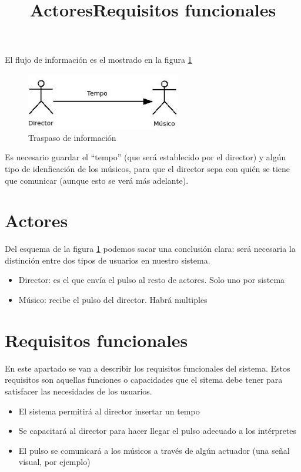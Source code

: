 El flujo de información es el mostrado en la figura \ref{fig:mensajesconceptual}
  \begin{figure}[htb]
  \centering
  \includegraphics[width=0.6\textwidth]{./imagenes/mensajesconceptual}
  \caption{Traspaso de información} \label{fig:mensajesconceptual}
  \end{figure}


Es necesario guardar el ``tempo'' (que será establecido por el director) y algún tipo
de idenficación de los músicos, para que el director sepa con quién se tiene que
comunicar (aunque esto se verá más adelante).\\


\title{Actores}
\section{Actores}
\label{sec:actoresRequisitos}

Del esquema de la figura \ref{fig:mensajesconceptual} podemos sacar una conclusión clara:
será necesaria la distinción entre dos tipos de usuarios en nuestro sistema.
  \begin{itemize}
    \item Director: es el que envía el pulso al resto de actores. Solo uno por sistema
    \item Músico: recibe el pulso del director. Habrá multiples
  \end{itemize}


\title{Requisitos funcionales}
\section{Requisitos funcionales}

En este apartado se van a describir los requisitos funcionales del sistema.
Estos requisitos son aquellas funciones o capacidades que el sitema debe
tener para satisfacer las necesidades de los usuarios.\\

\begin{itemize}
    \item[\textbf{RF.1}] El sistema permitirá al director insertar un tempo
    \item[\textbf{RF.2}] Se capacitará al director para hacer llegar el pulso adecuado a los intérpretes
    \item[\textbf{RF.3}] El pulso se comunicará a los músicos a través de algún actuador (una señal visual, por ejemplo)
\end{itemize}


